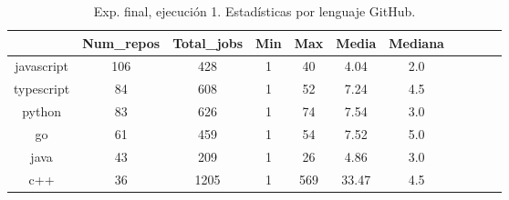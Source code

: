 \begin{table}[h]
  \centering
  \caption{Exp. final, ejecución 1. Estadísticas por lenguaje GitHub.}
  \label{tab:tabla_f_1_3}

\begin{footnotesize}
\renewcommand{\arraystretch}{1.5} %
\begin{tabular}{ccccccccccc}
  \hline
  {} &  Num\_repos &  Total\_jobs &  Min &  Max &  Media &  Mediana \\
  \hline
  javascript       &        106 &         428 &    1 &   40 &   4.04 &      2.0 \\
  typescript       &         84 &         608 &    1 &   52 &   7.24 &      4.5 \\
  python           &         83 &         626 &    1 &   74 &   7.54 &      3.0 \\
  go               &         61 &         459 &    1 &   54 &   7.52 &      5.0 \\
  java             &         43 &         209 &    1 &   26 &   4.86 &      3.0 \\
  c++              &         36 &        1205 &    1 &  569 &  33.47 &      4.5 \\

\end{tabular}
\end{footnotesize}
\end{table}
